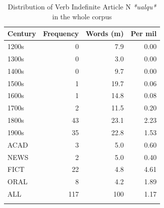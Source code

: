\begin{table}
\begin{tabular}{lrrr}
\lsptoprule
Century &  Frequency &  Words (m) &  Per mil\\
  \midrule
  1200s& 0& 7.9& 0.00\\
  1300s& 0& 3.0& 0.00\\
  1400s& 0& 9.7& 0.00\\
  1500s& 1& 19.7& 0.06\\
  1600s& 1& 14.8& 0.08\\
  1700s& 2& 11.5& 0.20\\
  1800s& 43& 23.1& 2.23\\
  1900s& 35& 22.8& 1.53\\
  \tablevspace
  ACAD& 3& 5.0& 0.60\\
  NEWS& 2& 5.0& 0.40\\
  FICT& 22& 4.8& 4.61\\
  ORAL & 8    & 4.2  & 1.89 \\
  \midrule
  ALL& 117& 100& 1.17\\
\lspbottomrule
\end{tabular}

\caption{Distribution of Verb Indefinite Article N \textit{*ualqu*} in the whole corpus}
\label{tab:extracted8}
\end{table}

